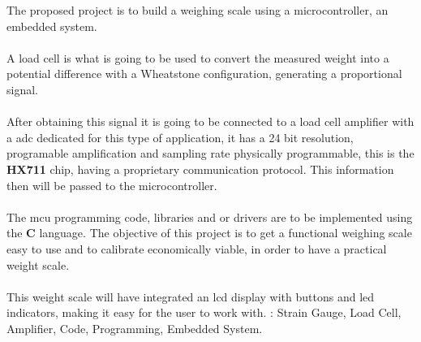 \begin{secondlangabstract}
\par The proposed project is to build a weighing scale using a microcontroller, an embedded system.
\\
\\
A load cell is what is going to be used to convert the measured weight into a potential difference with a Wheatstone configuration, generating a proportional signal.
\\
\\
After obtaining this signal it is going to be connected to a load cell amplifier with a \ac{adc} dedicated for this type of application, it has a 24 bit resolution, programable amplification and sampling rate physically programmable, this is the \textbf{HX711} chip, having a proprietary communication protocol.
This information then will be passed to the microcontroller.
\\
\\
The \ac{mcu} programming code, libraries and or drivers are to be implemented using the \textbf{C} language. The objective of this project is to get a functional weighing scale easy to use and to calibrate economically viable, in order to have a practical weight scale.
\\
\\
This weight scale will have integrated an \acs{lcd} display with buttons and led indicators, making it easy for the user to work with.
\vfill
\noindent
\textbf{\keywordslabel}: Strain Gauge, Load Cell, Amplifier, Code, Programming, Embedded System.
\end{secondlangabstract}

